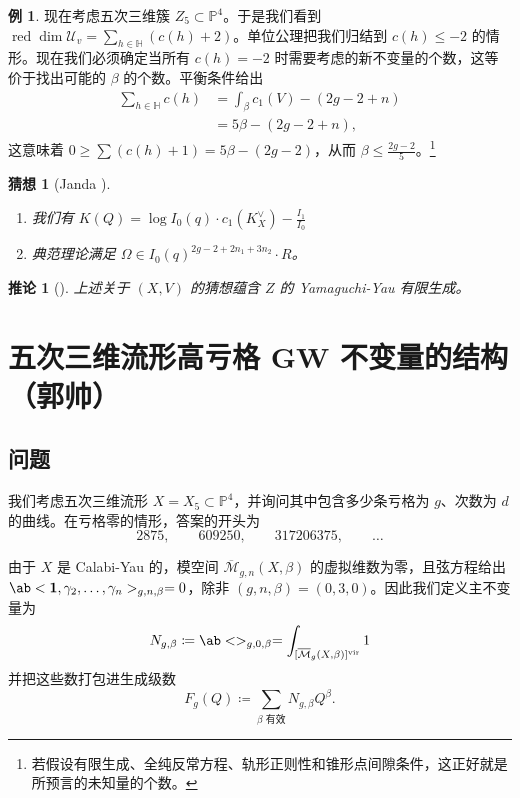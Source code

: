 \documentclass{amsart}
\newtheorem{cor}[thm]{推论}
\newtheorem{conj}[thm]{猜想}
\theoremstyle{definition}
\newtheorem{exm}[thm]{例}
\theoremstyle{remark}
\theoremstyle{plain}
\theoremstyle{definition}
\theoremstyle{remark}
\renewcommand{\H}{\mathbb{H}}
\renewcommand{\P}{\mathbb{P}}
\newcommand{\Mbar}{\overline{\mathcal{M}}}
\newcommand{\mc}[1]{\mathcal{#1}}
\newcommand{\mr}[1]{\mathrm{#1}}
\newcommand{\on}[1]{\operatorname{#1}}
\newcommand{\1}{\mathbf{1}}
\newcommand{\2}{\mathbf{2}}
\newcommand{\3}{\mathbf{3}}
\newcommand{\vir}{\mr{vir}}
\begin{document}
\begin{exm}
    现在考虑五次三维簇 \(Z_5 \subset \P^4\)。于是我们看到 \(\on{red}\dim \mc{U}_v = \sum_{h \in \H} (c(h)+2)\)。单位公理把我们归结到 \(c(h) \leq -2\) 的情形。现在我们必须确定当所有 \(c(h) = -2\) 时需要考虑的新不变量的个数，这等价于找出可能的 \(\beta\) 的个数。平衡条件给出
    \begin{align*}
        \sum_{h \in \H} c(h) &= \int_{\beta} c_1(V) - (2g-2+n) \\
        &= 5\beta - (2g-2+n),
    \end{align*}
    这意味着 \(0 \geq \sum (c(h)+1) = 5\beta - (2g-2)\)，从而 \(\beta \leq \frac{2g-2}{5}\)。\footnote{若假设有限生成、全纯反常方程、轨形正则性和锥形点间隙条件，这正好就是所预言的未知量的个数。}
\end{exm}

\begin{conj}[Janda {\cite[Conjecture~1.6]{CJRtropical2025}}]\leavevmode
    \begin{enumerate}
        \item 我们有 \(K(Q) = \log I_0(q) \cdot c_1(K_X^{\vee}) - \frac{I_1}{I_0}\) \\
        \item 典范理论满足 \(\Omega \in I_0(q)^{2g-2+2n_1 + 3 n_2} \cdot R\)。 
    \end{enumerate}
\end{conj}

\begin{cor}[{\cite[定理~1.7]{CJRtropical2025}}]
    上述关于 \((X, V)\) 的猜想蕴含 \(Z\) 的 Yamaguchi-Yau 有限生成。
\end{cor}

\section{五次三维流形高亏格 GW 不变量的结构（郭帅）}%
\label{sec:Structure of higher-genus GW invariants of the quintic (Shuai Guo)}

\subsection{问题}%
\label{sub:The problem (Guo)}

我们考虑五次三维流形 \(X = X_5 \subset \P^4\)，并询问其中包含多少条亏格为 \(g\)、次数为 \(d\) 的曲线。在亏格零的情形，答案的开头为
\[ 2875, \qquad 609250, \qquad 317206375, \qquad \ldots \]

由于 \(X\) 是 Calabi-Yau 的，模空间 \(\Mbar_{g,n}(X,\beta)\) 的虚拟维数为零，且弦方程给出 \(\ab<\1, \gamma_2, \ldots, \gamma_n>_{g,n,\beta} = 0\)，除非 \((g,n,\beta) = (0,3,0)\)。因此我们定义主不变量为
\[ N_{g,\beta} \coloneqq \ab<>_{g,0,\beta} = \int_{[\Mbar_g(X,\beta)]^{\vir}} 1 \]
并把这些数打包进生成级数
\[ F_g(Q) \coloneqq \sum_{\beta \text{ 有效}} N_{g,\beta}Q^{\beta}. \]
\end{document}

